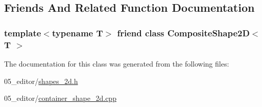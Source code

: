 \subsection{Friends And Related Function Documentation}
\subsubsection[{\texorpdfstring{Composite\+Shape2\+D$<$ T $>$}{CompositeShape2D< T >}}]{\setlength{\rightskip}{0pt plus 5cm}template$<$typename T$>$ friend class {\bf Composite\+Shape2D}$<$ T $>$\hspace{0.3cm}{\ttfamily [friend]}}\hypertarget{classGraphicalEditorCore_1_1Shape2DContainer_ad3ba7f8293bd2db1bdd18a1f4b2f2eb8}{}\label{classGraphicalEditorCore_1_1Shape2DContainer_ad3ba7f8293bd2db1bdd18a1f4b2f2eb8}


The documentation for this class was generated from the following files\+:\begin{DoxyCompactItemize}
\item 
05\+\_\+editor/\hyperlink{shapes__2d_8h}{shapes\+\_\+2d.\+h}\item 
05\+\_\+editor/\hyperlink{container__shape__2d_8cpp}{container\+\_\+shape\+\_\+2d.\+cpp}\end{DoxyCompactItemize}
